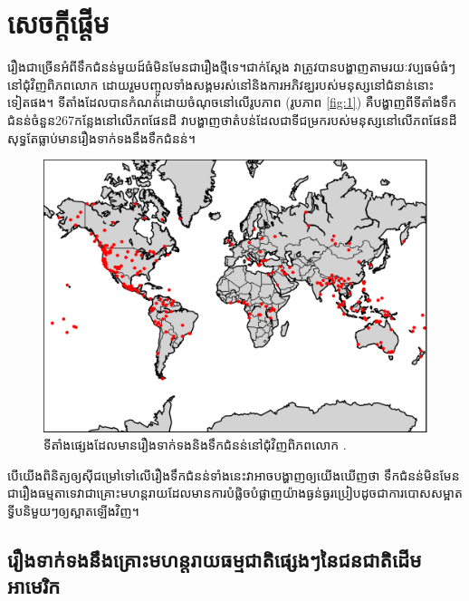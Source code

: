 \documentclass[10pt,twocolumn,letterpaper]{article}
\begin{document}
\section{សេចក្តីផ្តើម}

រឿងជាច្រើនអំពីទឹកជំនន់មួយដ៍ធំមិនមែនជារឿងថ្មីទេ។​ជាក់ស្តែង វាត្រូវបានបង្ហាញតាមរយៈវប្បធម៌ធំៗនៅជុំវិញពិភពលោក ដោយរួមបញ្ចូលទាំងសង្គមរស់នៅនិងការអភិវឌ្ឃរបស់មនុស្សនៅជំនាន់នោះទៀតផង។ ទីតាំងដែលបានកំណត់ដោយចំណុចនៅលើរូបភាព (រូបភាព \ref{fig:1}) គឺបង្ហាញពីទីតាំងទឹកជំនន់ចំនួន​267កន្លែងនៅលើភពផែនដី \cite{3} វាបង្ហាញថាតំបន់ដែលជាទីជម្រករបស់មនុស្សនៅលើភពផែនដីសុទ្ធតែធ្លាប់មានរឿងទាក់ទងនឹងទឹកជំនន់។

\begin{figure}[h]
\begin{center}
   \includegraphics[width=1\linewidth]{b.png}
\end{center}
   \caption{ទីតាំងផ្សេងដែលមានរឿងទាក់ទងនិងទឹកជំនន់នៅជុំវិញពិភពលោក \cite{3}.}
\label{fig:1}
\label{fig:onecol}
\end{figure}

បើយើងពិនិត្យឲ្យស៊ីជម្រៅទៅលើរឿងទឹកជំនន់ទាំងនេះ​វាអាចបង្ហាញឲ្យយើងឃើញថា ទឹកជំនន់មិនមែនជារឿងធម្មតាទេ​វាជាគ្រោះមហន្តរាយដែលមានការបំផ្លិចបំផ្លាញយ៉ាងធ្ងន់ធ្ងរប្រៀបដូចជាការបោសសម្អាតទ្វីបនិមួយៗឲ្យស្អាតឡើងវិញ។​

\subsection{រឿងទាក់ទងនឹងគ្រោះមហន្តរាយធម្មជាតិផ្សេងៗនៃជនជាតិដើមអាមេរិក}
\end{document}
